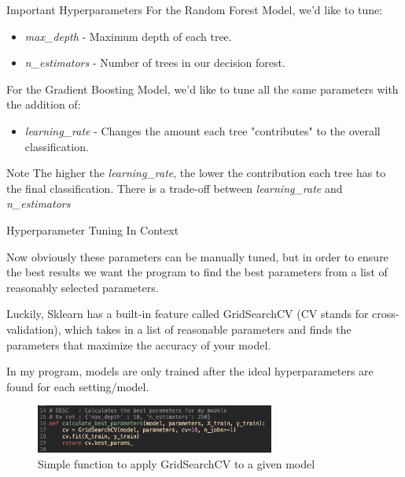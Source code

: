 \documentclass[11pt]{beamer}
\begin{document}
\begin{frame}{Important Hyperparameters}
    For the Random Forest Model, we'd like to tune:
    \begin{itemize}
        \item \textit{max\_depth} - Maximum depth of each tree. 
        \item \textit{n\_estimators} - Number of trees in our decision forest.
    \end{itemize}
    
    \vspace{5mm}
    
    For the Gradient Boosting Model, we'd like to tune all the same parameters with the addition of:
    \begin{itemize}
        \item \textit{learning\_rate} - Changes the amount each tree "contributes" to the overall classification.
    \end{itemize}

    \begin{block}{Note}
        The higher the \textit{learning\_rate}, the lower the contribution each tree has to the final classification.
        There is a trade-off between \textit{learning\_rate} and \textit{n\_estimators} \cite{gradientboostdocs}
    \end{block}
\end{frame}

\begin{frame}{Hyperparameter Tuning In Context}
    \par Now obviously these parameters can be manually tuned, but in order to ensure the best results we want the program to find the best parameters from a list of reasonably selected parameters.
    
    \vspace{3mm}
    
    \par Luckily, Sklearn has a built-in feature called GridSearchCV (CV stands for cross-validation), which takes in a list of reasonable parameters and finds the parameters that maximize the accuracy of your model.
    
    \vspace{3mm}
    
    \par In my program, models are only trained after the ideal hyperparameters are found for each setting/model.
    
    \begin{figure}
        \caption{Simple function to apply GridSearchCV to a given model}
        \label{fig:logo_UFES}
        \centering
        \includegraphics[width=0.7\textwidth]{imagens/grid_search_fn.png}
        
        \medskip
    \end{figure}
\end{frame}
\end{document}
